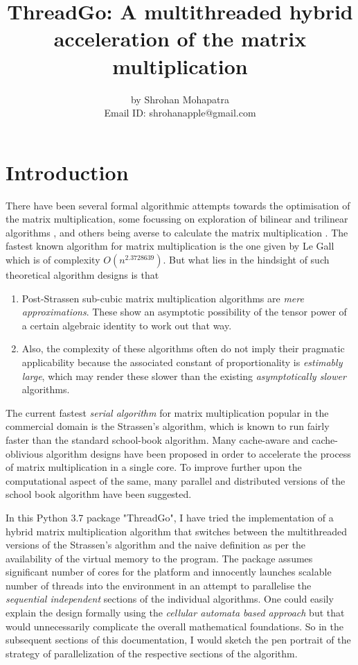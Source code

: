 \documentclass{article}
\title{ThreadGo: A multithreaded hybrid acceleration of the matrix multiplication}
\author{
by Shrohan Mohapatra \\
Email ID: shrohanapple@gmail.com
}
\begin{document}
\maketitle

\section{Introduction}

There have been several formal algorithmic attempts towards the optimisation of the matrix multiplication, some focussing on exploration of bilinear and trilinear algorithms \cite{strassen, schonhage, coppersmith, kleinberg, williams}, and others being averse to calculate the matrix multiplication \cite{raz}. The fastest known algorithm for matrix multiplication is the one given by Le Gall \cite{legall} which is of complexity $O(n^{2.3728639})$. But what lies in the hindsight of such theoretical algorithm designs is that

\begin{enumerate}
	\item Post-Strassen sub-cubic matrix multiplication algorithms are \textit{mere approximations}. These show an asymptotic possibility of the tensor power of a certain algebraic identity to work out that way.
	\item Also, the complexity of these algorithms often do not imply their pragmatic applicability because the associated constant of proportionality is \textit{estimably large}, which may render these slower than the existing \textit{asymptotically slower} algorithms.
\end{enumerate}

The current fastest \textit{serial algorithm} for matrix multiplication popular in the commercial domain is the Strassen's algorithm, which is known to run fairly faster than the standard school-book algorithm. Many cache-aware and cache-oblivious algorithm designs have been proposed \cite{skeina, harald, lam} in order to accelerate the process of matrix multiplication in a single core. To improve further upon the computational aspect of the same, many parallel and distributed versions \cite{randall,irony, kak} of the school book algorithm have been suggested.

In this Python 3.7 package "ThreadGo", I have tried the implementation of a hybrid matrix multiplication algorithm that switches between the multithreaded versions of the Strassen's algorithm and the naive definition as per the availability of the virtual memory to the program. The package assumes significant number of cores for the platform and innocently launches scalable number of threads into the environment in an attempt to parallelise the \textit{sequential independent} sections of the individual algorithms. One could easily explain the design formally using the \textit{cellular automata based approach} \cite{shrohan} but that would unnecessarily complicate the overall mathematical foundations. So in the subsequent sections of this documentation, I would sketch the pen portrait of the strategy of parallelization of the respective sections of the algorithm.
\end{document}
